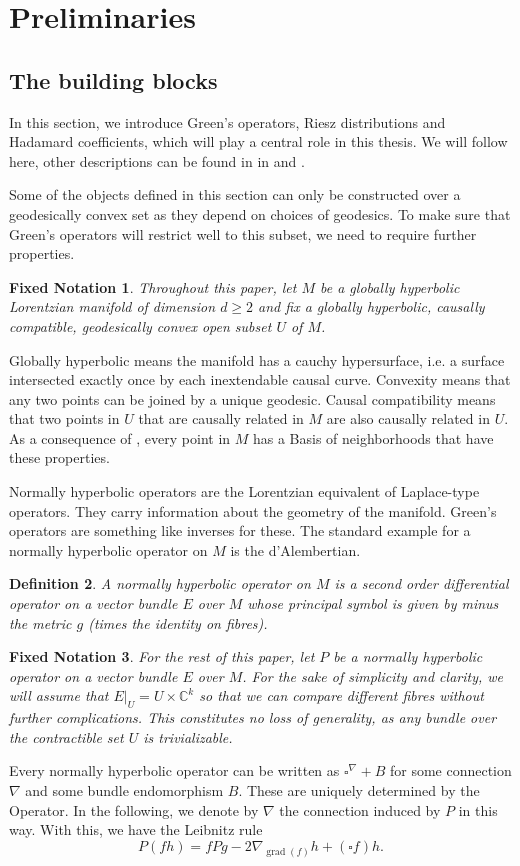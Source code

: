 \documentclass[11pt]{article}
\def\C{{\mathbb{C}}}
\newtheorem{df}{Definition}[section]
\newtheorem{gn}[df]{Fixed Notation}
\DeclareMathOperator{\grad}{grad}
\begin{document}
\section{Preliminaries}
\subsection{The building blocks}
In this section, we introduce Green's operators, Riesz distributions and Hadamard coefficients, which will play a central role in this thesis. We will follow \cite{BGP} here, other descriptions can be found in in \cite {Gun} and \cite {Fri}.

Some of the objects defined in this section can only be constructed over a geodesically convex set as they depend on choices of geodesics. To make sure that Green's operators will restrict well to this subset, we need to require further properties.

\begin{gn}
	Throughout this paper, let $M$ be a globally hyperbolic Lorentzian manifold of dimension $d\geq 2$ and fix a globally hyperbolic, causally compatible, geodesically convex open subset $U$ of $M$.
\end{gn}
Globally hyperbolic means the manifold has a cauchy hypersurface, i.e. a surface intersected exactly once by each inextendable causal curve. Convexity means that any two points can be joined by a unique geodesic. Causal compatibility means that two points in $U$ that are causally related in $M$ are also causally related in $U$.
As a consequence of \cite[Corollary 2 and Remark 14]{Min}, every point in $M$ has a Basis of neighborhoods that have these properties.

Normally hyperbolic operators are the Lorentzian equivalent of  Laplace-type operators. They carry information about the geometry of the manifold. Green's operators are something like inverses for these. The standard example for a normally hyperbolic operator on $M$ is the d'Alembertian.
\begin{df}
	\label{dfP}
	A normally hyperbolic operator on $M$ is a second order differential operator on a vector bundle $E$ over $M$ whose principal symbol is given by minus the metric $g$ (times the identity on fibres).
\end{df}
\begin{gn}
	For the rest of this paper, let $P$ be a normally hyperbolic operator on a vector bundle $E$ over $M$. \label{gnP}
	For the sake of simplicity and clarity, we will assume that $E|_{U}=U\times\C^k$ so that we can compare different fibres without further complications. This constitutes no loss of generality, as any bundle over the contractible set $U$ is trivializable.
\end{gn}
Every normally hyperbolic operator can be written as $\square^\nabla+B$ for some connection $\nabla$ and some bundle endomorphism $B$. These are uniquely determined by the Operator. In the following, we denote by $\nabla$ the connection induced by $P$ in this way. With this, we have the Leibnitz rule
\[P(fh)=fPg-2\nabla_{\grad(f)}h+(\square f)h.\]
\end{document}
